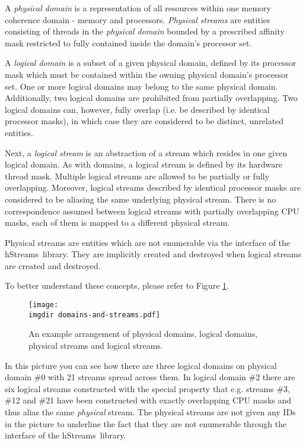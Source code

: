 \documentclass[a4,oneside]{book}
\newcommand{\hstreams}{hStreams}
\newcommand{\imgdir}{../../../doc/images/}
\begin{document}
A \emph{physical domain} is a representation of all resources within one memory coherence domain - memory and processors.
\emph{Physical streams} are entities consisting of threads in the \emph{physical domain} bounded by a prescribed affinity mask restricted to fully contained inside the domain's processor set.

A \emph{logical domain} is a subset of a given physical domain, defined by its processor mask which must be contained within the owning physical domain's processor set.
One or more logical domains may belong to the same physical domain.
Additionally, two logical domains are prohibited from partially overlapping.
Two logical domains can, however, fully overlap (i.e. be described by identical processor masks), in which case they are considered to be distinct, unrelated entities.

Next, a \emph{logical stream} is an abstraction of a stream which resides in one given logical domain.
As with domains, a logical stream is defined by its hardware thread mask.
Multiple logical streams are allowed to be partially or fully overlapping.
Moreover, logical streams described by identical processor masks are considered to be aliasing the same underlying physical stream.
There is no correspondence assumed between logical streams with partially overlapping CPU masks, each of them is mapped to a different physical stream.

Physical streams are entities which are not enumerable via the interface of the \hstreams\ library.
They are implicitly created and destroyed when logical streams are created and destroyed.

To better understand these concepts, please refer to Figure \ref{fig:phys-log-dom-str}.
\begin{figure}[h]
    \centering
    \texttt{[image: \\imgdir domains-and-streams.pdf]}
    \caption{An example arrangement of physical domains, logical domains, physical streams and logical streams.}
    \label{fig:phys-log-dom-str}
\end{figure}
In this picture you can see how there are three logical domains on physical domain \#0 with 21 streams spread across them.
In logical domain \#2 there are six logical streams constructed with the special property that e.g. streams \#3, \#12 and \#21 have been constructed with exactly overlapping CPU masks and thus alias the same \emph{physical} stream.
The physical streams are not given any IDs in the picture to underline the fact that they are not enumerable through the interface of the \hstreams\ library.
\end{document}

